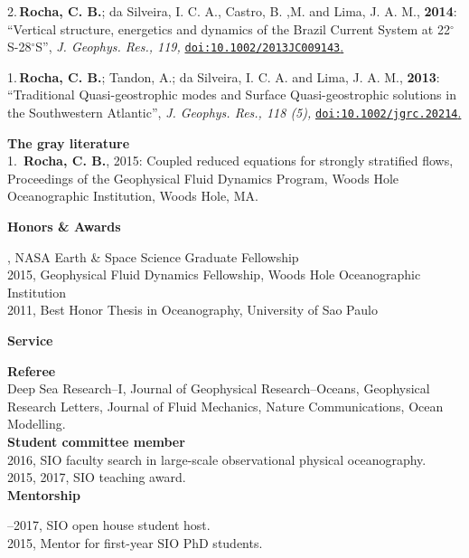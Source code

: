 \documentclass[a4paper,11pt,final]{memoir}
\newcommand{\Sep}{\vspace{1.25em}}
\newcommand{\SmallSep}{\vspace{0.5em}}
\newcommand{\CVSection}[1]
    {\Large\textbf{#1}\par
    \SmallSep\normalsize\normalfont}
\newcommand{\CVItem}[1]
    {\textbf{\color{NavyBlue} #1}}
\begin{document}
\SmallSep

2.\,\textbf{Rocha, C. B.};  da Silveira, I. C. A., Castro, B. ,M. and Lima, J. A. M., \textbf{2014}: ``Vertical structure, energetics and dynamics of the Brazil Current System at 22$^\circ$S-28$^\circ$S'', \textit{ J. Geophys. Res., 119,} \href{http://onlinelibrary.wiley.com/doi/10.1002/2013JC009143/abstract}{\texttt{doi:10.1002/2013JC009143}.}

\SmallSep

1.\,\textbf{Rocha, C. B.}; Tandon, A.; da Silveira, I. C. A. and Lima, J. A. M., \textbf{2013}: ``Traditional Quasi-geostrophic modes and Surface Quasi-geostrophic solutions in the Southwestern Atlantic'', \textit{ J. Geophys. Res., 118 (5),} \href{http://dx.doi.org/10.1002/jgrc.20214}{\texttt{doi:10.1002/jgrc.20214}.}

\SmallSep

\clearpage
\framebreak
\framebreak


\CVItem{The gray literature}\\

1.\, \textbf{Rocha, C. B.}, 2015: Coupled reduced equations for strongly stratified flows,  Proceedings of the Geophysical Fluid Dynamics Program,  Woods Hole Oceanographic Institution, Woods Hole, MA.

\Sep

\CVSection{Honors \& Awards}
2016, NASA Earth \& Space Science Graduate Fellowship\\
2015, Geophysical Fluid Dynamics Fellowship, Woods Hole Oceanographic Institution\\
2011, Best Honor Thesis in Oceanography, University of Sao Paulo

\Sep

\CVSection{Service}

\CVItem{Referee}\\
Deep Sea Research--I, Journal of Geophysical Research--Oceans,
           Geophysical Research Letters, Journal of
           Fluid Mechanics, Nature Communications, Ocean Modelling. \\

\CVItem{Student committee member}\\
2016, SIO faculty search in large-scale observational physical oceanography.\\
2015, 2017,  SIO teaching award.\\

\CVSection{Mentorship}
2015--2017, SIO open house student host.\\
2015,  Mentor for first-year SIO PhD students.
\end{document}
